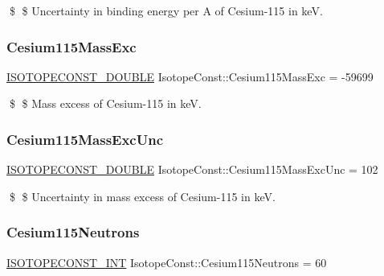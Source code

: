 \$ \$ Uncertainty in binding energy per A of Cesium-\/115 in keV. \mbox{\label{group___isotope_const-_cesium-_cs115_gac6723f5828b28d88127017d5474d78be}} 
\subsubsection{\texorpdfstring{Cesium115\+Mass\+Exc}{Cesium115MassExc}}
{\footnotesize\ttfamily \mbox{\hyperlink{group___isotope_const-_macros_ga8f45a7272ce02c0b4c65c44636ed719a}{I\+S\+O\+T\+O\+P\+E\+C\+O\+N\+S\+T\+\_\+\+D\+O\+U\+B\+LE}} Isotope\+Const\+::\+Cesium115\+Mass\+Exc = -\/59699}

\$ \$ Mass excess of Cesium-\/115 in keV. \mbox{\label{group___isotope_const-_cesium-_cs115_gaa8010a53214159115bd02eaee63b4622}} 
\subsubsection{\texorpdfstring{Cesium115\+Mass\+Exc\+Unc}{Cesium115MassExcUnc}}
{\footnotesize\ttfamily \mbox{\hyperlink{group___isotope_const-_macros_ga8f45a7272ce02c0b4c65c44636ed719a}{I\+S\+O\+T\+O\+P\+E\+C\+O\+N\+S\+T\+\_\+\+D\+O\+U\+B\+LE}} Isotope\+Const\+::\+Cesium115\+Mass\+Exc\+Unc = 102}

\$ \$ Uncertainty in mass excess of Cesium-\/115 in keV. \mbox{\label{group___isotope_const-_cesium-_cs115_ga1767f5b75e5a37454468b3d881a4dfa9}} 
\subsubsection{\texorpdfstring{Cesium115\+Neutrons}{Cesium115Neutrons}}
{\footnotesize\ttfamily \mbox{\hyperlink{group___isotope_const-_macros_ga5f18360b3e99483a35c32d789e62621c}{I\+S\+O\+T\+O\+P\+E\+C\+O\+N\+S\+T\+\_\+\+I\+NT}} Isotope\+Const\+::\+Cesium115\+Neutrons = 60}

